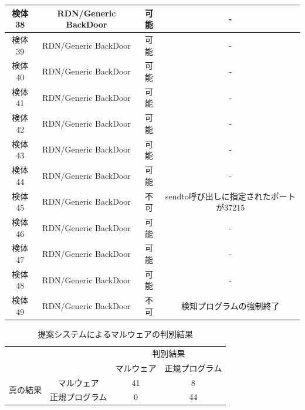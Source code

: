 \begin{small}
\begin{flushleft}
\begin{longtable}{|c|c|c|c|}
        検体38 & RDN/Generic BackDoor & 可能    & -                             \\ \hline
        検体39 & RDN/Generic BackDoor & 可能    & -                             \\ \hline
        検体40 & RDN/Generic BackDoor & 可能    & -                             \\ \hline
        検体41 & RDN/Generic BackDoor & 可能    & -                             \\ \hline
        検体42 & RDN/Generic BackDoor & 可能    & -                             \\ \hline
        検体43 & RDN/Generic BackDoor & 可能    & -                             \\ \hline
        検体44 & RDN/Generic BackDoor & 可能    & -                             \\ \hline
        検体45 & RDN/Generic BackDoor & 不可    & sendto呼び出しに指定されたポートが37215      \\ \hline
        検体46 & RDN/Generic BackDoor & 可能    & -                             \\ \hline
        検体47 & RDN/Generic BackDoor & 可能    & -                             \\ \hline
        検体48 & RDN/Generic BackDoor & 可能    & -                             \\ \hline
        検体49 & RDN/Generic BackDoor & 不可    & 検知プログラムの強制終了                  \\ \hline
\end{longtable}
\end{flushleft}
\end{small}

\begin{table}[h]
    \centering
    \caption{提案システムによるマルウェアの判別結果}
    \label{tab:detect}
    \begin{tabular}{cc|c|c|}
    \cline{3-4}
    & \multicolumn{1}{l|}{} & \multicolumn{2}{c|}{判別結果} \\ \cline{3-4} 
    &                       & マルウェア      & 正規プログラム      \\ \hline
    \multicolumn{1}{|c|}{\multirow{2}{*}{真の結果}} & マルウェア                 & 41         & 8            \\ \cline{2-4} 
    \multicolumn{1}{|c|}{}                      & 正規プログラム               & 0          & 44           \\ \hline
    \end{tabular}
    \end{table}

